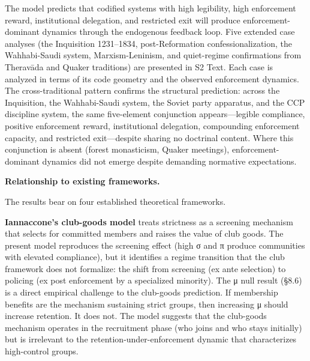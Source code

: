 \documentclass[12pt]{article}
\begin{document}
The model predicts that codified systems with high legibility, high
enforcement reward, institutional delegation, and restricted exit will
produce enforcement-dominant dynamics through the endogenous feedback
loop. Five extended case analyses (the Inquisition 1231--1834,
post-Reformation confessionalization, the Wahhabi-Saudi system,
Marxism-Leninism, and quiet-regime confirmations from Therav\=ada and
Quaker traditions) are presented in S2 Text. Each case is analyzed in
terms of its code geometry and the observed enforcement dynamics. The
cross-traditional pattern confirms the structural prediction: across the
Inquisition, the Wahhabi-Saudi system, the Soviet party apparatus, and
the CCP discipline system, the same five-element conjunction
appears---legible compliance, positive enforcement reward, institutional
delegation, compounding enforcement capacity, and restricted exit---despite
sharing no doctrinal content. Where this conjunction is absent (forest
monasticism, Quaker meetings), enforcement-dominant dynamics did not
emerge despite demanding normative expectations.


\textbf{Relationship to existing frameworks.}

The results bear on four established theoretical frameworks.

\textbf{Iannaccone's club-goods model} treats strictness as a screening mechanism that selects for committed members and raises the value of club goods. The present model reproduces the screening effect (high σ and π produce communities with elevated compliance), but it identifies a regime transition that the club framework does not formalize: the shift from screening (ex ante selection) to policing (ex post enforcement by a specialized minority). The μ null result (§8.6) is a direct empirical challenge to the club-goods prediction. If membership benefits are the mechanism sustaining strict groups, then increasing μ should increase retention. It does not. The model suggests that the club-goods mechanism operates in the recruitment phase (who joins and who stays initially) but is irrelevant to the retention-under-enforcement dynamic that characterizes high-control groups.
\end{document}
